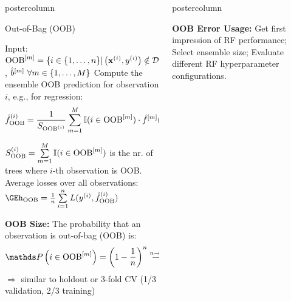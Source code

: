 \documentclass{beamer}
\newlength{\columnheight} %
\begin{document}
\begin{frame}[fragile]{}
\begin{columns}
\begin{column}{.31\textwidth}
\begin{beamercolorbox}[center]{postercolumn}
\begin{minipage}{.98\textwidth}
{      \begin{myblock}{Out-of-Bag (OOB)}
       \begin{algorithm}[H]
              \small
              \caption{Out-Of-Bag error estimation to evaluate different RF hyperparameter configurations}
              \begin{algorithmic}[1]
                \State Input: $\mathrm{OOB}^{[m]} = \{i \in \{1, \ldots, n\} | \left(\mathbf{x}^{(i)}, y^{(i)}\right) \notin \mathcal{D}^{[m]}\}$, $\hat{b}^{[m]} \ \forall m \in \{1, \dots, M\}$
                  \State Compute the ensemble OOB prediction for observation $i$, e.g., for regression:
                  $$\hat{f}^{(i)}_{\mathrm{OOB}} =
                  \frac{1}{S_{\mathrm{OOB}^{(i)}}} \sum\limits_{m=1}^M
                  \mathbb{I}(i \in \mathrm{OOB}^{[m]}) \cdot \hat{f}^{[m]}(\mathbf{x}^{(i)}) $$

                  $S_{\mathrm{OOB}}^{(i)} = \sum\limits_{m=1}^M \mathbb{I}(i \in \mathrm{OOB}^{[m]})$ is the nr. of trees where $i$-th observation is OOB.
                \EndFor
                \State Average losses over all observations: $\GEh_{\oob} = \meanin L(\yi, \fh^{(i)}_{\oob})$
            
              \end{algorithmic}
            \end{algorithm}

            \textbf{OOB Size:} The probability that an observation is out-of-bag (OOB) is:
            $$\P \left(i \in \oobm\right) = \left(1 - \frac{1}{n}\right)^n \stackrel{n \to \infty}{\longrightarrow} \frac{1}{e} \approx 0.37$$
            $\Rightarrow$ similar to holdout or 3-fold CV (1/3 validation, 2/3 training)
            
\end{myblock}
}
\end{minipage}
\end{beamercolorbox}
\end{column}


\begin{column}{.31\textwidth}
\begin{beamercolorbox}[center]{postercolumn}
\begin{minipage}{.98\textwidth}
\parbox[t][\columnheight]{\textwidth}{
  \begin{myblock}{ }
\textbf{OOB Error Usage:}
Get first impression of RF performance; Select ensemble size; Evaluate different RF hyperparameter configurations.
\end{myblock}

}
\end{minipage}
\end{beamercolorbox}
\end{column}
\end{columns}
\end{frame}
\end{document}
